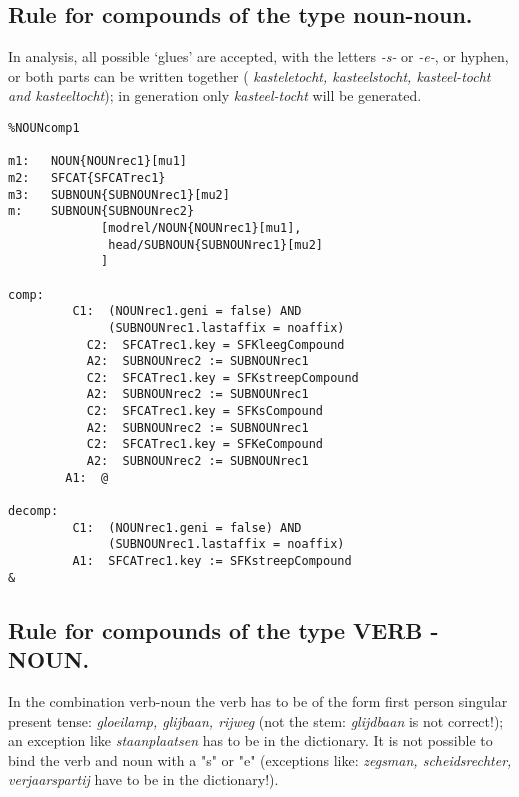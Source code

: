 \newpage
\subsection{Rule for compounds of the type noun-noun.}

In analysis, all possible `glues' are accepted, 
with the letters {\em -s-} or {\em -e-}, or hyphen, 
or both parts can be written together
( {\em kasteletocht, kasteelstocht, kasteel-tocht and kasteeltocht}); 
in generation only {\em kasteel-tocht} will be generated.

\begin{verbatim}
%NOUNcomp1

m1:   NOUN{NOUNrec1}[mu1]
m2:   SFCAT{SFCATrec1}
m3:   SUBNOUN{SUBNOUNrec1}[mu2]
m:    SUBNOUN{SUBNOUNrec2}
             [modrel/NOUN{NOUNrec1}[mu1],
              head/SUBNOUN{SUBNOUNrec1}[mu2]
             ]

comp:
         C1:  (NOUNrec1.geni = false) AND
              (SUBNOUNrec1.lastaffix = noaffix)
           C2:  SFCATrec1.key = SFKleegCompound
           A2:  SUBNOUNrec2 := SUBNOUNrec1
           C2:  SFCATrec1.key = SFKstreepCompound
           A2:  SUBNOUNrec2 := SUBNOUNrec1
           C2:  SFCATrec1.key = SFKsCompound
           A2:  SUBNOUNrec2 := SUBNOUNrec1
           C2:  SFCATrec1.key = SFKeCompound
           A2:  SUBNOUNrec2 := SUBNOUNrec1
        A1:  @

decomp:
         C1:  (NOUNrec1.geni = false) AND
              (SUBNOUNrec1.lastaffix = noaffix)
         A1:  SFCATrec1.key := SFKstreepCompound
&
\end{verbatim}
\newpage
\subsection{Rule for compounds of the type VERB - NOUN.}

In the combination verb-noun the verb has to be of the form
first person singular present tense: {\em gloeilamp, glijbaan,
rijweg} (not the stem: {\em glijdbaan} is not correct!); an
exception like {\em staanplaatsen} has to be in the dictionary.
It is not possible to bind the verb and noun with a "s" or "e"
(exceptions like: {\em zegsman, scheidsrechter, verjaarspartij}
have to be in the dictionary!).

